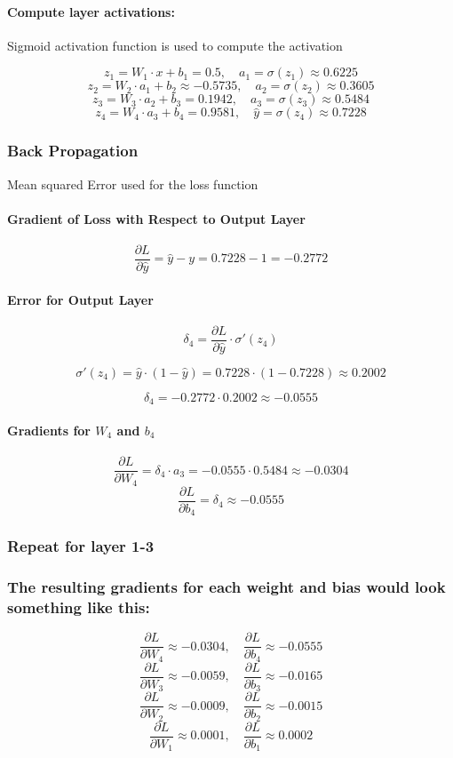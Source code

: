 \documentclass{article}
\begin{document}
\paragraph{Compute layer activations:} Sigmoid activation function is used to compute the activation

\[
z_1 = W_1 \cdot x + b_1 = 0.5, \quad a_1 = \sigma(z_1) \approx 0.6225
\]
\[
z_2 = W_2 \cdot a_1 + b_2 \approx -0.5735, \quad a_2 = \sigma(z_2) \approx 0.3605
\]
\[
z_3 = W_3 \cdot a_2 + b_3 = 0.1942, \quad a_3 = \sigma(z_3) \approx 0.5484
\]
\[
z_4 = W_4 \cdot a_3 + b_4 = 0.9581, \quad \hat{y} = \sigma(z_4) \approx 0.7228
\]

\subsubsection{Back Propagation} Mean squared Error used for the loss function


\paragraph{Gradient of Loss with Respect to Output Layer}

\[
\frac{\partial L}{\partial \hat{y}} = \hat{y} - y = 0.7228 - 1 = -0.2772
\]

\paragraph{Error for Output Layer}
\[
\delta_4 = \frac{\partial L}{\partial \hat{y}} \cdot \sigma'(z_4)
\]

\[
\sigma'(z_4) = \hat{y} \cdot (1 - \hat{y}) = 0.7228 \cdot (1 - 0.7228) \approx 0.2002
\]

\[
\delta_4 = -0.2772 \cdot 0.2002 \approx -0.0555
\]

\paragraph{Gradients for \( W_4 \) and \( b_4 \)}
\[
\frac{\partial L}{\partial W_4} = \delta_4 \cdot a_3 = -0.0555 \cdot 0.5484 \approx -0.0304
\]
\[
\frac{\partial L}{\partial b_4} = \delta_4 \approx -0.0555
\]


\subsubsection{Repeat for layer 1-3}

\subsubsection{The resulting gradients for each weight and bias would look something like this:}
\[
\frac{\partial L}{\partial W_4} \approx -0.0304, \quad \frac{\partial L}{\partial b_4} \approx -0.0555
\]
\[
\frac{\partial L}{\partial W_3} \approx -0.0059, \quad \frac{\partial L}{\partial b_3} \approx -0.0165
\]
\[
\frac{\partial L}{\partial W_2} \approx -0.0009, \quad \frac{\partial L}{\partial b_2} \approx -0.0015
\]
\[
\frac{\partial L}{\partial W_1} \approx 0.0001, \quad \frac{\partial L}{\partial b_1} \approx 0.0002
\]
\end{document}
